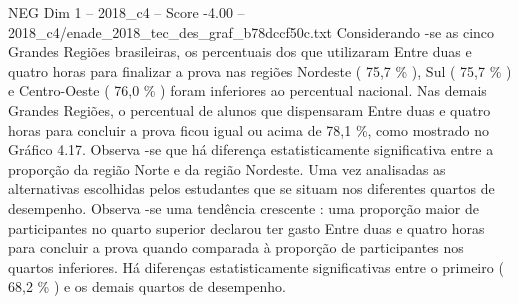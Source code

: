 \begin{textsample}{NEG Dim 1 – 2018\_c4 – Score -4.00 – 2018\_c4/enade\_2018\_tec\_des\_graf\_b78dccf50c.txt}
Considerando -se as cinco Grandes Regiões brasileiras, os percentuais dos que utilizaram Entre duas e quatro horas para finalizar a prova nas regiões Nordeste ( 75,7 \% ), Sul ( 75,7 \% ) e Centro-Oeste ( 76,0 \% ) foram inferiores ao percentual nacional.
Nas demais Grandes Regiões, o percentual de alunos que dispensaram Entre duas e quatro horas para concluir a prova ficou igual ou acima de 78,1 \%, como mostrado no Gráfico 4.17.
Observa -se que há diferença estatisticamente significativa entre a proporção da região Norte e da região Nordeste.
Uma vez analisadas as alternativas escolhidas pelos estudantes que se situam nos diferentes quartos de desempenho.
Observa -se uma tendência crescente : uma proporção maior de participantes no quarto superior declarou ter gasto Entre duas e quatro horas para concluir a prova quando comparada à proporção de participantes nos quartos inferiores.
Há diferenças estatisticamente significativas entre o primeiro ( 68,2 \% ) e os demais quartos de desempenho.

\end{textsample}
